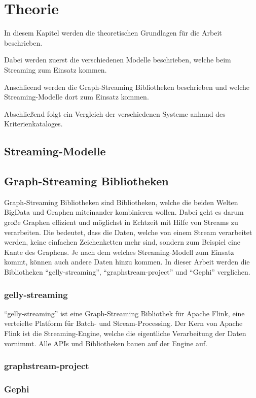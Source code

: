 \chapter{Theorie}
In diesem Kapitel werden die theoretischen Grundlagen für die Arbeit beschrieben.

Dabei werden zuerst die verschiedenen Modelle beschrieben, welche beim Streaming
zum Einsatz kommen.

Anschlieend werden die Graph-Streaming Bibliotheken beschrieben und welche
Streaming-Modelle dort zum Einsatz kommen.

Abschließend folgt ein Vergleich der verschiedenen Systeme anhand des
Kriterienkataloges.

\section{Streaming-Modelle}
\section{Graph-Streaming Bibliotheken}
Graph-Streaming Bibliotheken sind Bibliotheken, welche die beiden Welten \gls{BigData}
und Graphen miteinander kombinieren wollen. Dabei geht es darum große Graphen
effizient und möglichst in Echtzeit mit Hilfe von Streams zu verarbeiten. Die
bedeutet, dass die Daten, welche von einem Stream verarbeitet werden, keine
einfachen Zeichenketten mehr sind, sondern zum Beispiel eine Kante des Graphens.
Je nach dem welches Streaming-Modell zum Einsatz kommt, können auch andere Daten
hinzu kommen. In dieser Arbeit werden die Bibliotheken \enquote{gelly-streaming},
\enquote{graphstream-project} und \enquote{Gephi} verglichen.

\subsection{gelly-streaming}
\enquote{gelly-streaming} ist eine Graph-Streaming Bibliothek für Apache Flink,
eine verteielte Platform für Batch- und Stream-Processing. Der Kern von
Apache Flink ist die Streaming-Engine, welche die eigentliche Verarbeitung der
Daten vornimmt. Alle \glspl{API} und Bibliotheken bauen auf der Engine auf.

\subsection{graphstream-project}
\subsection{Gephi}

